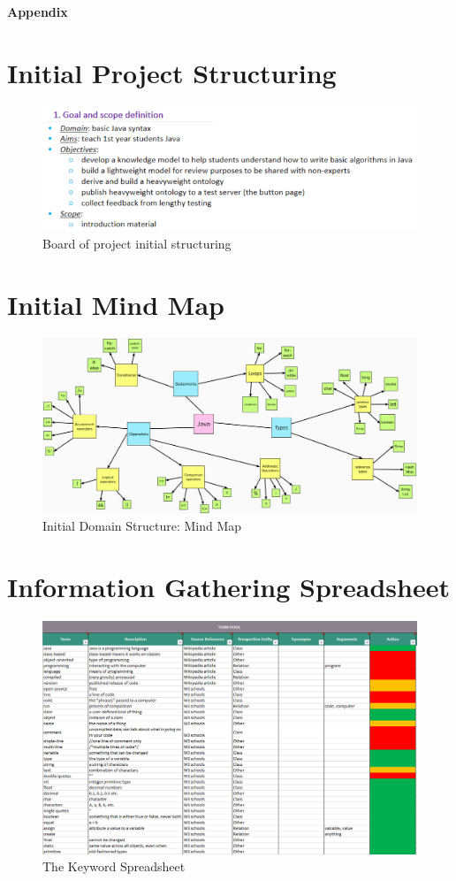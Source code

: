 \documentclass[titlepage]{article}
\begin{document}
\Large{\bf{Appendix}}
\appendix
\section{Initial Project Structuring}
\begin{figure}[h!]
\includegraphics[scale = 0.9, center]{goal_scope.png}
\caption{Board of project initial structuring}
\end{figure}
\section{Initial Mind Map}
\begin{figure}[h!]
\includegraphics[scale = 0.095, center]{mural_latest.png}
\caption{Initial Domain Structure: Mind Map}
\end{figure}
\newpage
\section{Information Gathering Spreadsheet}
\begin{figure}[h!]
\includegraphics[scale = 0.7, center]{spreadsheet.png}
\caption{The Keyword Spreadsheet}
\end{figure}
\newpage
\end{document}
